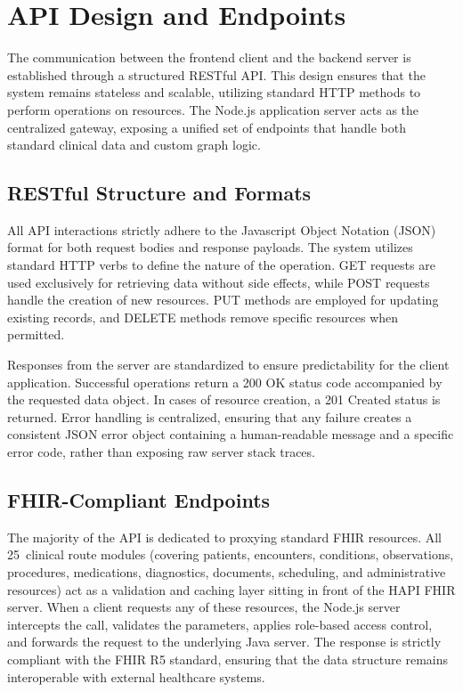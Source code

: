 \section{API Design and Endpoints}
\label{sec:api_design}

The communication between the frontend client and the backend server is
established through a structured RESTful API. This design ensures that the
system remains stateless and scalable, utilizing standard HTTP methods to
perform operations on resources. The Node.js application server acts as the
centralized gateway, exposing a unified set of endpoints that handle both
standard clinical data and custom graph logic.

\subsection{RESTful Structure and Formats}
All API interactions strictly adhere to the Javascript Object Notation (JSON)
format for both request bodies and response payloads. The system utilizes
standard HTTP verbs to define the nature of the operation. GET requests are
used exclusively for retrieving data without side effects, while POST requests
handle the creation of new resources. PUT methods are employed for updating
existing records, and DELETE methods remove specific resources when permitted.

Responses from the server are standardized to ensure predictability for the
client application. Successful operations return a 200 OK status code
accompanied by the requested data object. In cases of resource creation, a 201
Created status is returned. Error handling is centralized, ensuring that any
failure creates a consistent JSON error object containing a human-readable
message and a specific error code, rather than exposing raw server stack
traces.

\subsection{FHIR-Compliant Endpoints}
The majority of the API is dedicated to proxying standard FHIR resources.
All 25~clinical route modules (covering patients, encounters, conditions,
observations, procedures, medications, diagnostics, documents, scheduling, and
administrative resources) act as a validation and caching layer sitting in
front of the HAPI FHIR server. When a client requests any of these resources,
the Node.js server intercepts the call, validates the parameters, applies
role-based access control, and forwards the request to the underlying Java
server. The response is strictly compliant with the FHIR R5 standard, ensuring
that the data structure remains interoperable with external healthcare systems.

